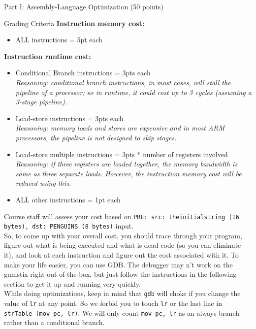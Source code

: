 \documentclass{article}
\begin{document}
\begin{section}{Part I: Assembly-Language Optimization (50 points)}
\begin{subsection}{Grading Criteria}
		 \noindent
        \textbf{Instruction memory cost:}
        \begin{itemize}
          \item ALL instructions = 5pt each
        \end{itemize}

		\noindent
        \textbf{Instruction runtime cost:}
        \begin{itemize}
        \item Conditional Branch instructions = 3pts each \\
        {\em Reasoning: conditional branch instructions, in most cases, will stall the pipeline of a processor; so in runtime, it could cost up to 3 cycles (assuming a 3-stage pipeline).}
        \item Load-store instructions = 3pts each \\
        {\em Reasoning: memory loads and stores are expensive and in most ARM processors, the pipeline is not designed to skip stages.}
        \item Load-store multiple instructions = 3pts * number of registers involved \\
        {\em Reasoning: if three registers are loaded together, the memory bandwidth is same as three separate loads. However, the instruction memory cost will be reduced using this.}
        \item ALL other instructions = 1pt each
        \end{itemize}

        Course staff will assess your cost based on \texttt{PRE: src: theinitialstring (16 bytes), dst: PENGUINS (8 bytes)} input. \\

        So, to come up with your overall cost, you should trace through your program, figure out what is being executed and what is dead code (so you can eliminate it), and look at each instruction and figure out the cost associated with it. To make your life easier, you can use GDB. The debugger may n't work on the gumstix right out-of-the-box, but just follow the instructions in the following section to get it up and running very quickly. \\

        While doing optimizations, keep in mind that \texttt{gdb} will choke if you change the value of \texttt{lr} at any point. So we forbid you to touch \texttt{lr} or the last line in \texttt{strTable (mov pc, lr)}. We will only count \texttt{mov pc, lr} as an always branch rather than a conditional branch. \\


\end{subsection}
\end{section}
\end{document}
